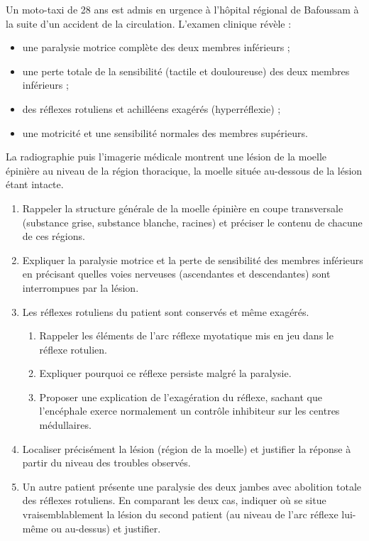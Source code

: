 \documentclass[11pt]{article}
\newcounter{popsec}
\newcounter{popsub}
\newcommand{\courssub}[1]{%
  \stepcounter{popsub}%
  \par\vspace{9pt}\noindent{\popxbold\fontsize{11.5}{13}\selectfont\color{popink}{\color{poporange}\thepopsec.\thepopsub}\hspace{6pt}#1}\par\nopagebreak\vspace{4pt}
}
\begin{document}
\courssub{Je me prépare au Bac}

\begin{exercice}
Un moto-taxi de 28 ans est admis en urgence à l'hôpital régional de Bafoussam à la suite d'un accident de la circulation. L'examen clinique révèle :
\begin{itemize}
\item une paralysie motrice complète des deux membres inférieurs ;
\item une perte totale de la sensibilité (tactile et douloureuse) des deux membres inférieurs ;
\item des réflexes rotuliens et achilléens exagérés (hyperréflexie) ;
\item une motricité et une sensibilité normales des membres supérieurs.
\end{itemize}
La radiographie puis l'imagerie médicale montrent une lésion de la moelle épinière au niveau de la région thoracique, la moelle située au-dessous de la lésion étant intacte.

\begin{enumerate}
\item Rappeler la structure générale de la moelle épinière en coupe transversale (substance grise, substance blanche, racines) et préciser le contenu de chacune de ces régions.
\item Expliquer la paralysie motrice et la perte de sensibilité des membres inférieurs en précisant quelles voies nerveuses (ascendantes et descendantes) sont interrompues par la lésion.
\item Les réflexes rotuliens du patient sont conservés et même exagérés.
\begin{enumerate}
\item Rappeler les éléments de l'arc réflexe myotatique mis en jeu dans le réflexe rotulien.
\item Expliquer pourquoi ce réflexe persiste malgré la paralysie.
\item Proposer une explication de l'exagération du réflexe, sachant que l'encéphale exerce normalement un contrôle inhibiteur sur les centres médullaires.
\end{enumerate}
\item Localiser précisément la lésion (région de la moelle) et justifier la réponse à partir du niveau des troubles observés.
\item Un autre patient présente une paralysie des deux jambes avec abolition totale des réflexes rotuliens. En comparant les deux cas, indiquer où se situe vraisemblablement la lésion du second patient (au niveau de l'arc réflexe lui-même ou au-dessus) et justifier.
\end{enumerate}
\end{exercice}
\end{document}
